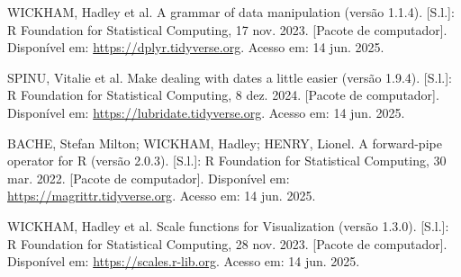\begin{thebibliography}{99}
     WICKHAM, Hadley et al. A grammar of data manipulation (versão 1.1.4). [S.l.]: R Foundation for Statistical Computing, 17 nov. 2023. [Pacote de computador]. Disponível em: 
    \href{https://dplyr.tidyverse.org}{https://dplyr.tidyverse.org}.  
    Acesso em: 14 jun. 2025.
    
     SPINU, Vitalie et al. Make dealing with dates a little easier (versão 1.9.4). [S.l.]: R Foundation for Statistical Computing, 8 dez. 2024. [Pacote de computador]. Disponível em: 
    \href{https://lubridate.tidyverse.org}{https://lubridate.tidyverse.org}.  
    Acesso em: 14 jun. 2025.
    
     BACHE, Stefan Milton; WICKHAM, Hadley; HENRY, Lionel. A forward-pipe operator for R (versão 2.0.3). [S.l.]: R Foundation for Statistical Computing, 30 mar. 2022. [Pacote de computador]. Disponível em: 
    \href{https://magrittr.tidyverse.org}{https://magrittr.tidyverse.org}.  
    Acesso em: 14 jun. 2025.
    
     WICKHAM, Hadley et al. Scale functions for Visualization (versão 1.3.0). [S.l.]: R Foundation for Statistical Computing, 28 nov. 2023. [Pacote de computador]. Disponível em: 
    \href{https://scales.r-lib.org}{https://scales.r-lib.org}.  
    Acesso em: 14 jun. 2025.

\end{thebibliography}
